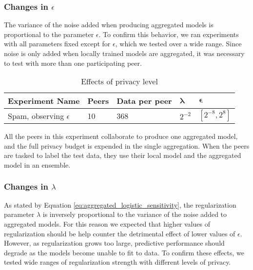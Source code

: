 \subsubsection{Changes in $\epsilon$}

The variance of the noise added when producing aggregated models is proportional to the parameter $\epsilon$. To confirm this behavior, we ran experiments with all parameters fixed except for $\epsilon$, which we tested over a wide range. Since noise is only added when locally trained models are aggregated, it was necessary to test with more than one participating peer.

\begin{table}[h]
	\centering
	\caption{Effects of privacy level}
	\label{tab:experiments_privacy_level}
	\begin{tabular}{|l|l|l|l|l|}
		\textbf{Experiment Name}            & \textbf{Peers} & \textbf{Data per peer} &
		 $\boldsymbol{\lambda}$ & $\boldsymbol{\epsilon}$                                              \\
		 \hline
		Spam, observing $\epsilon$ & 10    & 368  & $2^{-2}$  & $[2^{-8}, 2^{8}]$
	\end{tabular}
\end{table}

All the peers in this experiment collaborate to produce one aggregated model, and the full privacy budget is expended in the single aggregation. When the peers are tasked to label the test data, they use their local model and the aggregated model in an ensemble.

\subsubsection{Changes in $\lambda$}

As stated by Equation \ref{eq:aggregated_logistic_sensitivity}, the regularization parameter $\lambda$ is inversely proportional to the variance of the noise added to aggregated models. For this reason we expected that higher values of regularization should be help counter the detrimental effect of lower values of $\epsilon$. However, as regularization grows too large, predictive performance should degrade as the models become unable to fit to data. To confirm these effects, we tested wide ranges of regularization strength with different levels of privacy.


